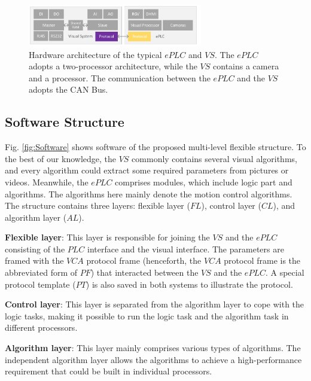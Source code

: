 \documentclass[journal,UTF8]{IEEEtran}
\begin{document}
	\begin{figure}
		\centering
		\includegraphics[width=3in]{fig/Hardware.pdf}
		\caption{Hardware architecture of the typical $ePLC$ and $VS$. The $ePLC$ adopts a two-processor architecture, while the $VS$ contains a camera and a processor. The communication between the $ePLC$ and the $VS$ adopts the CAN Bus.}
		\label{fig:Hardware}
	\end{figure}
	\subsection{Software Structure}
	Fig. \ref{fig:Software} shows software of the proposed multi-level flexible structure. To the best of our knowledge, the $VS$ commonly contains several visual algorithms, and every algorithm could extract some required parameters from pictures or videos. Meanwhile, the $ePLC$ comprises modules, which include logic part and algorithms. The algorithms here mainly denote the motion control algorithms. The structure contains three layers: flexible layer ($FL$), control layer ($CL$), and algorithm layer ($AL$).
	
	\textbf{Flexible layer}: This layer is responsible for joining the $VS$ and the $ePLC$ consisting of the $PLC$ interface and the visual interface. The parameters are framed with the $VCA$ protocol frame (henceforth, the $VCA$ protocol frame is the abbreviated form of $PF$) that interacted between the $VS$ and the $ePLC$. A special protocol template ($PT$) is also saved in both systems to illustrate the protocol.
	
	\textbf{Control layer}: This layer is separated from the algorithm layer to cope with the logic tasks, making it possible to run the logic task and the algorithm task in different processors.
	
	\textbf{Algorithm layer}: This layer mainly comprises various types of algorithms. The independent algorithm layer allows the algorithms to achieve a high-performance requirement that could be built in individual processors. 
	
\end{document}
